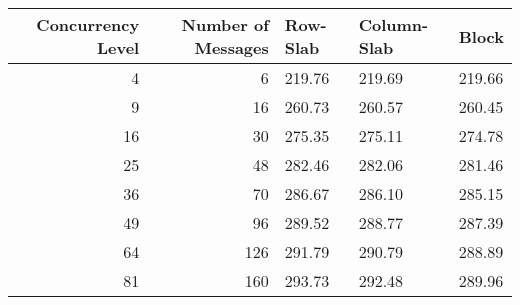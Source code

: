 \begin{tabular}{rrlll}
\toprule
Concurrency Level & Number of Messages & Row-Slab & Column-Slab & Block \\
\midrule
4 & 6 & 219.76 & 219.69 & 219.66 \\
9 & 16 & 260.73 & 260.57 & 260.45 \\
16 & 30 & 275.35 & 275.11 & 274.78 \\
25 & 48 & 282.46 & 282.06 & 281.46 \\
36 & 70 & 286.67 & 286.10 & 285.15 \\
49 & 96 & 289.52 & 288.77 & 287.39 \\
64 & 126 & 291.79 & 290.79 & 288.89 \\
81 & 160 & 293.73 & 292.48 & 289.96 \\
\bottomrule
\end{tabular}
